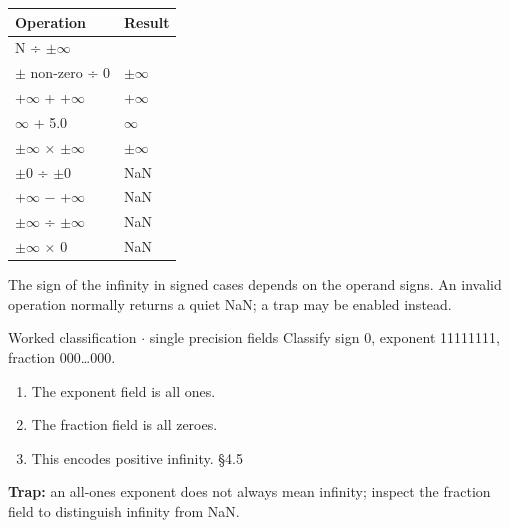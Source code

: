 \documentclass[11pt]{article}
\begin{document}
\begin{keepsection}
\begin{keepsection}
\begin{center}\small\begin{tabularx}{\linewidth}{>{\raggedright\arraybackslash}X>{\raggedright\arraybackslash}X}\toprule
\textbf{Operation} & \textbf{Result} \\ \midrule
N ÷ \ensuremath{\pm}\ensuremath{\infty} & 0 \\
\ensuremath{\pm} non-zero ÷ 0 & \ensuremath{\pm}\ensuremath{\infty} \\
+\ensuremath{\infty} + +\ensuremath{\infty} & +\ensuremath{\infty} \\
\ensuremath{\infty} + 5.0 & \ensuremath{\infty} \\
\ensuremath{\pm}\ensuremath{\infty} \ensuremath{\times} \ensuremath{\pm}\ensuremath{\infty} & \ensuremath{\pm}\ensuremath{\infty} \\
\ensuremath{\pm}0 ÷ \ensuremath{\pm}0 & NaN \\
+\ensuremath{\infty} \ensuremath{-} +\ensuremath{\infty} & NaN \\
\ensuremath{\pm}\ensuremath{\infty} ÷ \ensuremath{\pm}\ensuremath{\infty} & NaN \\
\ensuremath{\pm}\ensuremath{\infty} \ensuremath{\times} 0 & NaN \\
\bottomrule\end{tabularx}\end{center}

The sign of the infinity in signed cases depends on the operand signs. An invalid operation normally returns a quiet NaN; a trap may be enabled instead.

\begin{workedbox}{Worked classification \ensuremath{\cdot} single precision fields}
Classify sign 0, exponent 11111111, fraction 000…000.

\begin{enumerate}
\item The exponent field is all ones.
\item The fraction field is all zeroes.
\item This encodes positive infinity. \hfill{\small\color{FAUblue}§4.5}
\end{enumerate}
\end{workedbox}

\begin{notebox}\textbf{Trap:} an all-ones exponent does not always mean infinity; inspect the fraction field to distinguish infinity from NaN.\end{notebox}
\end{keepsection}


\end{keepsection}
\end{document}
